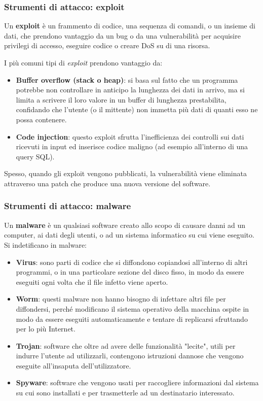         \subsubsection{Strumenti di attacco: exploit}
            Un \textbf{exploit} è un frammento di codice, una sequenza di comandi, o un insieme di dati, che prendono vantaggio da un bug o da una vulnerabilità per acquisire privilegi di accesso, eseguire codice o creare DoS su di una risorsa.
        
            I più comuni tipi di \textit{exploit} prendono vantaggio da:
            \begin{itemize}
                \item \textbf{Buffer overflow (stack o heap)}: si basa sul fatto che un programma potrebbe non controllare in anticipo la lunghezza dei dati in arrivo, ma si limita a scrivere il loro valore in un buffer di lunghezza prestabilita, confidando che l'utente (o il mittente) non immetta più dati di quanti esso ne possa contenere.
                \item \textbf{Code injection}: questo exploit sfrutta l'inefficienza dei controlli sui dati ricevuti in input ed inserisce codice maligno (ad esempio all'interno di una query SQL).
            \end{itemize}

            Spesso, quando gli exploit vengono pubblicati, la vulnerabilità viene eliminata attraverso una patch che produce una nuova versione del software.

        \subsubsection{Strumenti di attacco: malware}
            Un \textbf{malware} è un qualsiasi software creato allo scopo di causare danni ad un computer, ai dati degli utenti, o ad un sistema informatico su cui viene eseguito. Si indetificano in malware:
            \begin{itemize}
                \item \textbf{Virus}: sono parti di codice che si diffondono copiandosi all'interno di altri programmi, o in una particolare sezione del disco fisso, in modo da essere eseguiti ogni volta che il file infetto viene aperto.
                \item \textbf{Worm}: questi malware non hanno bisogno di infettare altri file per diffondersi, perché modificano il sistema operativo della macchina ospite in modo da essere eseguiti automaticamente e tentare di replicarsi sfruttando per lo più Internet.
                \item \textbf{Trojan}: software che oltre ad avere delle funzionalità "lecite", utili per indurre l'utente ad utilizzarli, contengono istruzioni dannose che vengono eseguite all'insaputa dell'utilizzatore.
                \item \textbf{Spyware}: software che vengono usati per raccogliere informazioni dal sistema su cui sono installati e per trasmetterle ad un destinatario interessato.
            \end{itemize}


